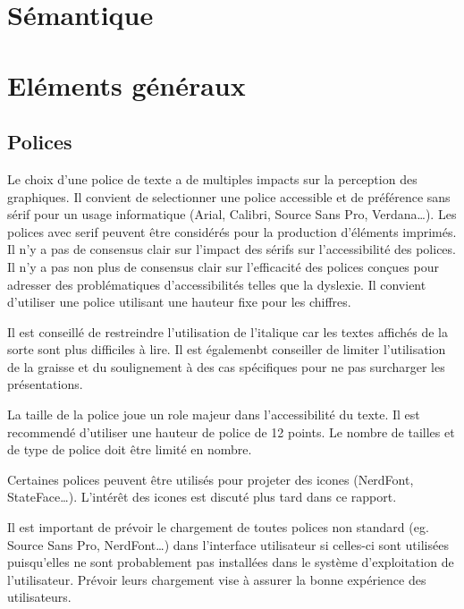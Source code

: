 \documentclass[a4paper,12pt]{article}
\begin{document}
\begin{multicols}{2}
\section*{Sémantique}
\label{sec:org5959dc5}

\section*{Eléments généraux}
\label{sec:org7b6c5d3}
\subsection*{Polices}
\label{sec:orgaa022b5}
Le choix d'une police de texte a de multiples impacts sur la perception des graphiques. Il convient de selectionner une police accessible et de préférence sans sérif pour un usage informatique (Arial, Calibri, Source Sans Pro, Verdana\ldots{}).\autocite{andreaskrauseBestPracticesData2024} Les polices avec serif peuvent être considérés pour la production d'éléments imprimés. Il n'y a pas de consensus clair sur l'impact des sérifs sur l'accessibilité des polices.\autocite{stephenfew8TableDesign2012} Il n'y a pas non plus de consensus clair sur l'efficacité des polices conçues pour adresser des problématiques d'accessibilités telles que la dyslexie. Il convient d'utiliser une police utilisant une hauteur fixe pour les chiffres.\autocite{stephenfew8TableDesign2012}

Il est conseillé de restreindre l'utilisation de l'italique car les textes affichés de la sorte sont plus difficiles à lire. Il est égalemenbt conseiller de limiter l'utilisation de la graisse et du soulignement à des cas spécifiques pour ne pas surcharger les présentations.

La taille de la police joue un role majeur dans l'accessibilité du texte. Il est recommendé d'utiliser une hauteur de police de 12 points.\autocite{andreaskrauseBestPracticesData2024} Le nombre de tailles et de type de police doit être limité en nombre.\autocite{andreaskrauseBestPracticesData2024}

Certaines polices peuvent être utilisés pour projeter des icones (NerdFont, StateFace\ldots{}).\autocite{jonathanschwabish10Qualitative2021} L'intérêt des icones est discuté plus tard dans ce rapport.

Il est important de prévoir le chargement de toutes polices non standard (eg. Source Sans Pro, NerdFont\ldots{}) dans l'interface utilisateur si celles-ci sont utilisées puisqu'elles ne sont probablement pas installées dans le système d'exploitation de l'utilisateur. Prévoir leurs chargement vise à assurer la bonne expérience des utilisateurs.

\end{multicols}
\end{document}
